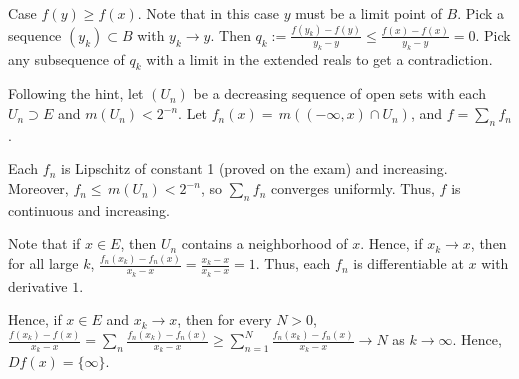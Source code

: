 \documentclass{article}
\begin{document}
Case $f(y) \ge f(x)$.  Note that in this case $y$ must be a limit point of $B$.  Pick a sequence $(y_k) \subset B$ with $y_k \to y$.  Then $q_k :=\frac {f(y_k) - f(y)}{y_k - y} \le \frac {f(x) - f(x)}{y_k - y} = 0$. Pick any subsequence of $q_k$ with a limit in the extended reals to get a contradiction.

 Following the hint, let $(U_n)$ be a decreasing sequence of open sets  with each $U_n \supset E$ and $m(U_n) < 2^{-n}$. Let 
$f_n(x) = \,m((-\infty,x) \cap U_n)$, and $f = \sum_n f_n$.

Each $f_n$ is Lipschitz of constant 1 (proved on the exam) and increasing. Moreover, $f_n \le \,m(U_n) < 2^{-n}$, so $\sum_n f_n$ converges uniformly. Thus, $f$ is continuous and increasing.

Note that if $x \in E$, then $U_n$ contains a neighborhood of $x$. Hence, if $x_k \to x$, then for all large $k$, $\frac {f_n(x_k) - f_n(x)}{x_k - x} = \frac {x_k -x}{x_k - x}  = 1$. Thus, each $f_n$ is differentiable at $x$ with derivative $1$.

Hence, if $x \in E$ and $x_k \to x$, then for every $N > 0$, $\frac {f(x_k) - f(x)}{x_k - x} = \sum_n \frac {f_n(x_k) - f_n(x)}{x_k - x} \ge \sum_{n=1}^N \frac {f_n(x_k) - f_n(x)}{x_k - x} \to N$ as $k \to \infty$. Hence, $Df(x) = \{\infty\}$.
\end{document}
